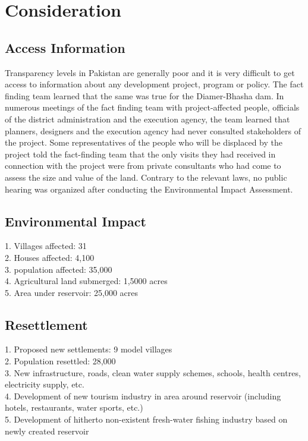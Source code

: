 \documentclass[11pt, journal,letterpaper,compsoc]{IEEEtran}
\begin{document}
\section{Consideration}

\subsection{Access Information}
Transparency levels in Pakistan are generally poor and it is very difficult to get access to information about any development project, program or policy. The fact finding team learned that the same was true for the Diamer-Bhasha dam. In numerous meetings of the fact finding team with project-affected people, officials of the district administration and the execution agency, the team learned that planners, designers and the execution agency had never consulted stakeholders of the project. Some representatives of the people who will be displaced by the project told the fact-finding team that the only visits they had received in connection with the project were from private consultants who had come to assess the size and value of the land. Contrary to the relevant laws, no public hearing was organized after conducting the Environmental Impact Assessment. 

\subsection{Environmental Impact}
1. Villages affected: 31 \\
2. Houses affected: 4,100 \\
3. population affected: 35,000 \\
4. Agricultural land submerged: 1,5000 acres \\
5. Area under reservoir: 25,000 acres 

\subsection{Resettlement}
 1. Proposed new settlements: 9 model villages  \\
 2.  Population resettled: 28,000 \\
 3. New infrastructure, roads, clean water supply schemes, schools, health centres, electricity supply, etc. \\ 
 4. Development of new tourism industry in area around reservoir (including hotels, restaurants, water sports, etc.) \\
 5. Development of hitherto non-existent fresh-water fishing industry based on newly created reservoir \\
\end{document}
